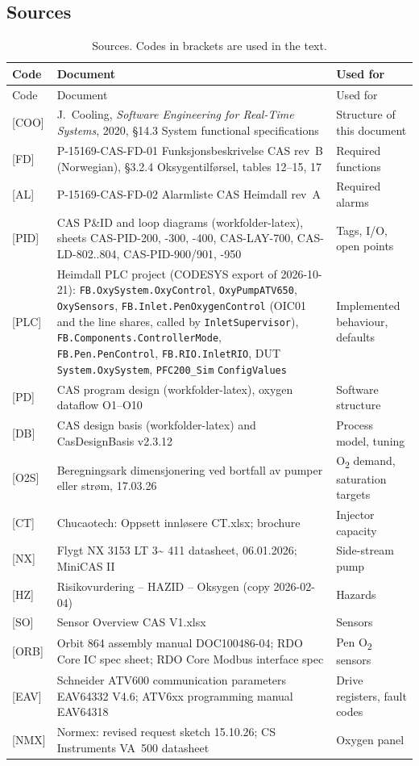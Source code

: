 \documentclass[11pt,a4paper]{article}
\newcommand{\Otwo}{O\textsubscript{2}}
\begin{document}
\subsection{Sources}
\begin{small}
\begin{longtable}{@{}P{14mm}P{98mm}P{45mm}@{}}
\caption{Sources. Codes in brackets are used in the text.}\label{tab:sources}\\
\toprule
Code & Document & Used for \\
\midrule
\endfirsthead
\toprule
Code & Document & Used for \\
\midrule
\endhead
\bottomrule
\endfoot
{[COO]} & J.~Cooling, \emph{Software Engineering for Real-Time Systems}, 2020, \S14.3 System functional specifications & Structure of this document \\
{[FD]} & P-15169-CAS-FD-01 Funksjonsbeskrivelse CAS rev~B (Norwegian), \S3.2.4 Oksygentilførsel, tables 12--15, 17 & Required functions \\
{[AL]} & P-15169-CAS-FD-02 Alarmliste CAS Heimdall rev~A & Required alarms \\
{[PID]} & CAS P\&ID and loop diagrams (workfolder-latex), sheets CAS-PID-200, -300, -400, CAS-LAY-700, CAS-LD-802..804, CAS-PID-900/901, -950 & Tags, I/O, open points \\
{[PLC]} & Heimdall PLC project (CODESYS export of 2026-10-21): \texttt{FB.OxySystem.OxyControl}, \texttt{OxyPumpATV650}, \texttt{OxySensors}, \texttt{FB.Inlet.PenOxygenControl} (OIC01 and the line shares, called by \texttt{InletSupervisor}), \texttt{FB.Components.ControllerMode}, \texttt{FB.Pen.PenControl}, \texttt{FB.RIO.InletRIO}, DUT \texttt{System.OxySystem}, \texttt{PFC200\_Sim} \texttt{ConfigValues} & Implemented behaviour, defaults \\
{[PD]} & CAS program design (workfolder-latex), oxygen dataflow O1--O10 & Software structure \\
{[DB]} & CAS design basis (workfolder-latex) and CasDesignBasis v2.3.12 & Process model, tuning \\
{[O2S]} & Beregningsark dimensjonering ved bortfall av pumper eller strøm, 17.03.26 & \Otwo{} demand, saturation targets \\
{[CT]} & Chucaotech: Oppsett innløsere CT.xlsx; brochure & Injector capacity \\
{[NX]} & Flygt NX 3153 LT 3\textasciitilde{} 411 datasheet, 06.01.2026; MiniCAS II & Side-stream pump \\
{[HZ]} & Risikovurdering -- HAZID -- Oksygen (copy 2026-02-04) & Hazards \\
{[SO]} & Sensor Overview CAS V1.xlsx & Sensors \\
{[ORB]} & Orbit 864 assembly manual DOC100486-04; RDO Core IC spec sheet; RDO Core Modbus interface spec & Pen \Otwo{} sensors \\
{[EAV]} & Schneider ATV600 communication parameters EAV64332 V4.6; ATV6xx programming manual EAV64318 & Drive registers, fault codes \\
{[NMX]} & Normex: revised request sketch 15.10.26; CS Instruments VA~500 datasheet & Oxygen panel \\
\end{longtable}
\end{small}
\end{document}
